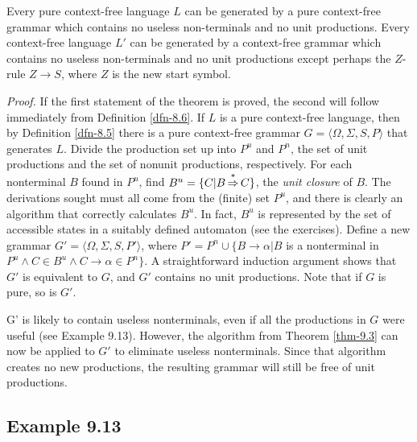 \begin{thm}\label{thm-9.4}
Every pure context-free language $L$ can be generated by a pure context-free
grammar which contains no useless non-terminals and no unit productions. Every
context-free language $L'$ can be generated by a context-free grammar which
contains no useless non-terminals and no unit productions except perhaps the
$Z$-rule $Z\rightarrow S$, where $Z$ is the new start symbol.

\emph{Proof.} If the first statement of the theorem is proved, the second will
follow immediately from Definition \ref{dfn-8.6}. If $L$ is a pure context-free language,
then by Definition \ref{dfn-8.5} there is a pure context-free grammar $G=\langle\Omega,
\Sigma,S,P\rangle$ that generates $L$. Divide the production set up into $P^u$
and $P^n$, the set of unit productions and the set of nonunit productions,
respectively. For each nonterminal $B$ found in $P^u$, find $B^u=\{C|B
\operatorname{\overset{*}{\Rightarrow}} C\}$, the \emph{unit closure} of $B$. The derivations sought must
all come from the (finite) set $P^u$, and there is clearly an algorithm that
correctly calculates $B^u$. In fact, $B^u$ is represented by the set of
accessible states in a suitably defined automaton (see the exercises). Define a
new grammar $G'=\langle\Omega,\Sigma,S,P'\rangle$, where $P'=P^n\cup\{B
\rightarrow\alpha|B$ is a nonterminal in $P^u\wedge C\in B^u\wedge C\rightarrow
\alpha\in P^n\}$. A straightforward induction argument shows that $G'$ is
equivalent to $G$, and $G'$ contains no unit productions. Note that if $G$ is
pure, so is $G'$.

G' is likely to contain useless nonterminals, even if all the productions in $G$
were useful (see Example 9.13). However, the algorithm from Theorem \ref{thm-9.3} can now
be applied to $G'$ to eliminate useless nonterminals. Since that algorithm
creates no new productions, the resulting grammar will still be free of unit
productions.
\end{thm}

\subsection*{Example 9.13}

